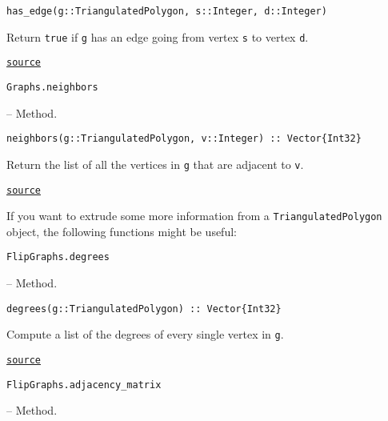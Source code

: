 \begin{adjustwidth}{2em}{0pt}


\begin{verbatim}
has_edge(g::TriangulatedPolygon, s::Integer, d::Integer)
\end{verbatim}

Return \texttt{true} if \texttt{g} has an edge going from vertex \texttt{s} to vertex \texttt{d}. 



\href{https://github.com/schto223/FlipGraphs.jl/blob/490c01a7adf74b42f27dda05099165c47ae8133e/src/polygonTriangulations.jl#L81-L85}{\texttt{source}}


\end{adjustwidth}
\hypertarget{14095625494301593323}{\texttt{Graphs.neighbors}}  -- {Method.}

\begin{adjustwidth}{2em}{0pt}


\begin{verbatim}
neighbors(g::TriangulatedPolygon, v::Integer) :: Vector{Int32}
\end{verbatim}

Return the list of all the vertices in \texttt{g} that are adjacent to \texttt{v}.



\href{https://github.com/schto223/FlipGraphs.jl/blob/490c01a7adf74b42f27dda05099165c47ae8133e/src/polygonTriangulations.jl#L95-L99}{\texttt{source}}


\end{adjustwidth}

If you want to extrude some more information from a \texttt{TriangulatedPolygon} object, the following functions might be useful: 


\hypertarget{9379494963205808776}{\texttt{FlipGraphs.degrees}}  -- {Method.}

\begin{adjustwidth}{2em}{0pt}


\begin{verbatim}
degrees(g::TriangulatedPolygon) :: Vector{Int32}
\end{verbatim}

Compute a list of the degrees of every single vertex in \texttt{g}.



\href{https://github.com/schto223/FlipGraphs.jl/blob/490c01a7adf74b42f27dda05099165c47ae8133e/src/polygonTriangulations.jl#L222-L226}{\texttt{source}}


\end{adjustwidth}
\hypertarget{2070049552425424645}{\texttt{FlipGraphs.adjacency\_matrix}}  -- {Method.}

